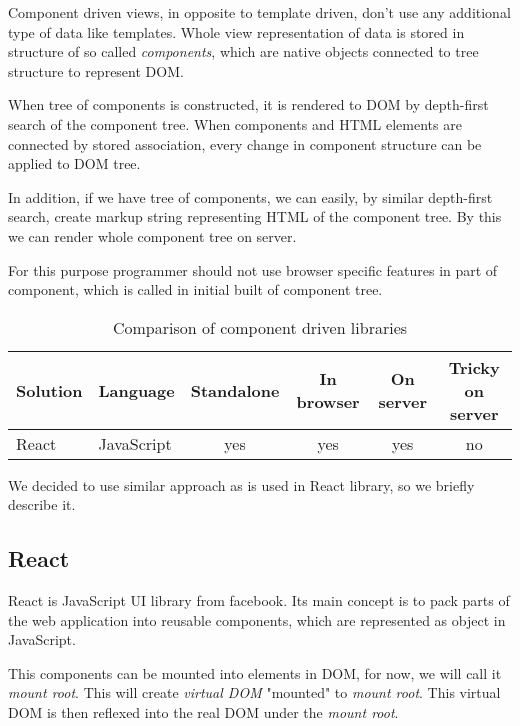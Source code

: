 	Component driven views, in opposite to template driven, don't use any additional type of data like templates. 
	Whole view representation of data is stored in structure of so called \textit{components}, 
	which are native objects connected to tree structure to represent DOM. 

	When tree of components is constructed, it is rendered to DOM by depth-first search of the component tree.
	When components and HTML elements are connected by stored association, 
	every change in component structure can be applied to DOM tree. 

	In addition, if we have tree of components, we can easily, by similar depth-first search, 
	create markup string representing HTML of the component tree.
	By this we can render whole component tree on server.

	For this purpose programmer should not use browser specific features in part of component, 
	which is called in initial built of component tree.

	\begin{table}
		\begin{tabular}{|l|l|c|c|c|c|}
			\hline
			\textbf{Solution}& \textbf{Language}   & \textbf{Standalone} & \textbf{In browser} & \textbf{On server} & \textbf{Tricky on server}\\
			\hline
			React            & JavaScript          &         yes         &        yes          &        yes         &           no             \\
			\hline
		\end{tabular}
		\caption{Comparison of component driven libraries}
		\label{table:component-driven-libraries}
	\end{table}

	We decided to use similar approach as is used in React library, so we briefly describe it.

	\subsection{React}\label{subsec:existing-component-react}
		
		React is JavaScript UI library from facebook. 
		Its main concept is to pack parts of the web application into reusable components, 
		which are represented as object in JavaScript. 

		This components can be mounted into elements in DOM, for now, we will call it \textit{mount root}. 
		This will create \textit{virtual DOM} "mounted" to \textit{mount root}. 
		This virtual DOM is then reflexed into the real DOM under the \textit{mount root}.

